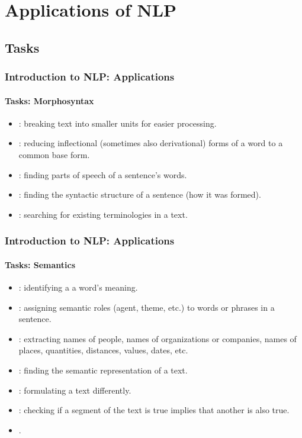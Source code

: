 \documentclass[xcolor=table]{beamer}
\begin{document}
\section{Applications of NLP}

%

\subsection{Tasks}

\begin{frame}
\frametitle{Introduction to NLP: Applications}
\framesubtitle{Tasks: Morphosyntax}

\begin{itemize}
	\item {}: breaking text into smaller units for easier processing.
	\item {}: reducing inflectional (sometimes also derivational) forms of a word to a common base form.
	\item {}: finding parts of speech of a sentence's words.
	\item {}: finding the syntactic structure of a sentence (how it was formed).
	\item {}: searching for existing terminologies in a text.
\end{itemize}

\end{frame}

\begin{frame}
\frametitle{Introduction to NLP: Applications}
\framesubtitle{Tasks: Semantics}

\begin{itemize}
	\item {}: identifying a a word's meaning.
	\item {}: assigning semantic roles (agent, theme, etc.) to words or phrases in a sentence.
	\item {}: extracting names of people, names of organizations or companies, names of places, quantities, distances, values, dates, etc.
	\item {}: finding the semantic representation of a text.
	\item {}: formulating a text differently.
	\item {}: checking if a segment of the text is true implies that another is also true.
	\item {}.
\end{itemize}

\end{frame}
\end{document}
